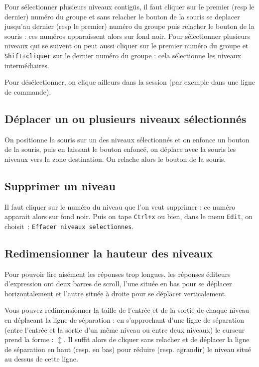 \documentclass[a4paper,11pt]{article}
\begin{document}
Pour s\'electionner plusieurs niveaux contig\"us, il faut cliquer sur le premier 
(resp le dernier) num\'ero du groupe 
et sans relacher le bouton de la souris se deplacer jusqu'au dernier
(resp le premier) num\'ero du groupe puis relacher le bouton de la 
souris : ces num\'eros apparaissent alors sur fond noir.
Pour s\'electionner plusieurs niveaux qui se suivent on peut aussi cliquer 
sur le premier num\'ero  du groupe et {\tt Shift+cliquer} sur le dernier 
num\'ero  du groupe : cela s\'electionne les niveaux interm\'ediaires.

Pour d\'es\'electionner, on clique ailleurs dans la session (par
exemple dans une ligne de commande).

\subsection{D\'eplacer un ou plusieurs niveaux s\'electionn\'es}
On positionne la souris sur un des niveaux s\'electionn\'es
et on enfonce un bouton de 
la souris, puis en laissant le bouton 
enfonc\'e, on d\'eplace avec la souris les niveaux vers la zone destination.
On relache alors le bouton de la souris. 

\subsection{Supprimer un niveau}
Il faut cliquer sur le num\'ero du niveau que l'on veut supprimer :
ce num\'ero apparait alors sur fond noir. Puis on tape {\tt Ctrl+x} ou bien, 
dans le menu {\tt Edit}, on choisit~:
{\tt Effacer niveaux selectionnes}.

\subsection{Redimensionner la hauteur des niveaux}
Pour pouvoir lire ais\'ement les r\'eponses trop longues, 
les r\'eponses \'editeurs d'expression ont deux barres de scroll, 
l'une situ\'ee en bas pour se d\'eplacer 
horizontalement et l'autre situ\'ee \`a droite pour se d\'eplacer
verticalement.

Vous pouvez redimensionner la taille de l'entr\'ee et de la sortie de 
chaque niveau en d\'eplacant la ligne de s\'eparation : en s'approchant d'une 
ligne de s\'eparation (entre l'entr\'ee et la sortie d'un m\^eme niveau ou 
entre deux niveaux) le curseur prend la forme : $\updownarrow$. Il suffit 
alors de cliquer sans relacher et de d\'eplacer la ligne de s\'eparation 
en haut (resp. en bas) pour r\'eduire (resp. agrandir) le niveau situ\'e au 
dessus de cette ligne.
\end{document}
